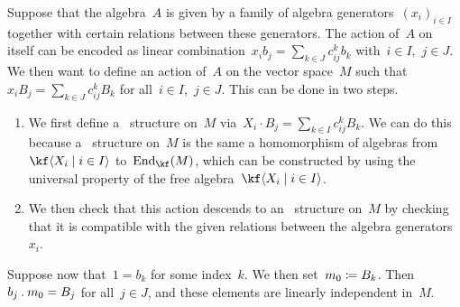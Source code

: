 \begin{construction}
  Suppose that the algebra~$A$ is given by a family of algebra generators~$(x_i)_{i \in I}$ together with certain relations between these generators.
  The action of~$A$ on itself can be encoded as linear combination~$x_i b_j = \sum_{k \in J} c_{ij}^k b_k$ with~$i \in I$,~$j \in J$.
  We then want to define an action of~$A$ on the vector space~$M$ such that~$x_i B_j = \sum_{k \in J} c_{ij}^k B_k$ for all~$i \in I$,~$j \in J$.
  This can be done in two steps.
  \begin{enumerate}
    \item
      We first define a~ structure on~$M$ via~$X_i \cdot B_j = \sum_{k \in I} c_{ij}^k B_k$.
      We can do this because a~ structure on~$M$ is the same a homomorphism of algebras from~$\kf\gen{X_i \suchthat i \in I}$ to~$\End_{\kf}(M)$, which can be constructed by using the universal property of the free algebra~$\kf\gen{X_i \suchthat i \in I}$.
    \item
      We then check that this action descends to an~ structure on~$M$ by checking that it is compatible with the given relations between the algebra generators~$x_i$.
  \end{enumerate} 
  Suppose now that~$1 = b_k$ for some index~$k$.
  We then set~$m_0 \coloneqq B_k$.
  Then~$b_j \mathbin{.} m_0 = B_j$ for all~$j \in J$, and these elements are linearly independent in~$M$.
\end{construction}

